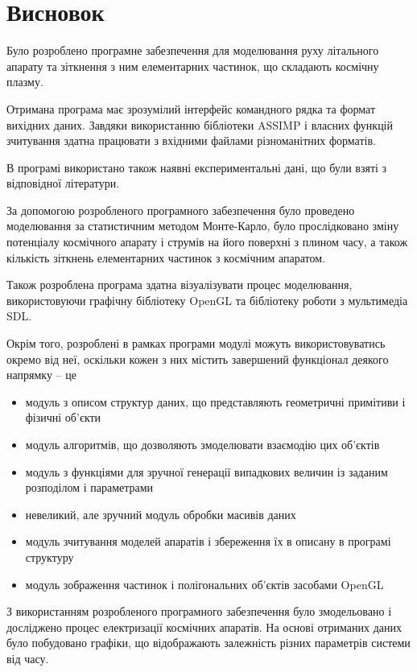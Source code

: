 \documentclass[a4paper,12pt]{article}
\begin{document}
\newpage

\section*{Висновок}
Було розроблено програмне забезпечення для моделювання руху літального апарату та зіткнення з ним елементарних частинок, що складають космічну плазму.

Отримана програма має зрозумілий інтерфейс командного рядка та формат вихідних даних. Завдяки використанню бібліотеки ASSIMP і власних функцій зчитування здатна працювати з вхідними файлами різноманітних форматів.

В програмі використано також наявні експериментальні дані, що були взяті з відповідної літератури.

За допомогою розробленого програмного забезпечення було проведено моделювання за статистичним методом Монте-Карло, було прослідковано зміну потенціалу космічного апарату і струмів на його поверхні з плином часу, а також кількість зіткнень елементарних частинок з космічним апаратом.

Також розроблена програма здатна візуалізувати процес моделювання, використовуючи графічну бібліотеку OpenGL та бібліотеку роботи з мультимедіа SDL.

Окрім того, розроблені в рамках програми модулі можуть використовуватись окремо від неї, оскільки кожен з них містить завершений функціонал деякого напрямку -- це
\begin{itemize}
  \item модуль з описом структур даних, що представляють геометричні примітиви і фізичні об’єкти
  \item модуль алгоритмів, що дозволяють змоделювати взаємодію цих об’єктів
  \item модуль з функціями для зручної генерації випадкових величин із заданим розподілом і параметрами
  \item невеликий, але зручний модуль обробки масивів даних
  \item модуль зчитування моделей апаратів і збереження їх в описану в програмі структуру
  \item модуль зображення частинок і полігональних об’єктів засобами OpenGL
\end{itemize}

З використанням розробленого програмного забезпечення було змодельовано і досліджено процес електризації космічних апаратів. На основі отриманих даних було побудовано графіки, що відображають залежність різних параметрів системи від часу.
\end{document}
